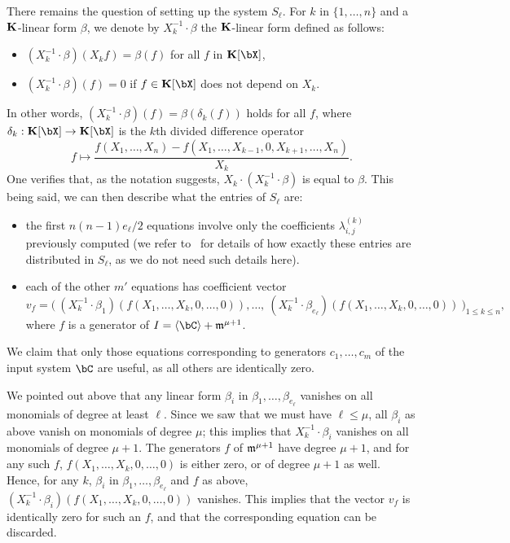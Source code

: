 \documentclass[12pt]{article}
\begin{document}
There remains the question of setting up the system $S_\ell$. For $k$
in $\{1,\dots,n\}$ and a $\mathbf{K}$-linear form $\beta$, we denote by
$X_k^{-1} \cdot \beta$ the $\mathbf{K}$-linear form defined as follows:
\begin{itemize}
\item $(X_k^{-1} \cdot \beta)(X_k f) = \beta(f)$ for all $f$ in $\KK[\bX]$,
\item $(X_k^{-1} \cdot \beta)(f)=0$ if $f\in \KK[\bX]$ does not depend on $X_k$.
\end{itemize}
In other words, $(X_k^{-1} \cdot \beta)(f)=\beta(\delta_k(f))$ holds
for all $f$, where $\delta_k:\KK[\bX] \to \KK[\bX]$ is the $k$th divided
difference operator
$$f\mapsto \frac
{f(X_1,\dots,X_n)-f(X_1,\dots,X_{k-1},0,X_{k+1},\dots,X_n)}{X_k}.$$
One verifies that, as the notation suggests, $X_k \cdot (X_k^{-1}
\cdot \beta)$ is equal to $\beta$. This being said, we can then
describe what the entries of $S_\ell$ are:
\begin{itemize}
\item the first $n(n-1) e_\ell/2$ equations involve only the coefficients 
  $\lambda^{(k)}_{i,j}$ previously computed (we refer to~\cite[Section~4.4]{Mourrain97} for details of how exactly 
these entries are distributed in $S_\ell$, as we do not need such details here).
\item each of the other $m'$ equations has coefficient vector
$$v_f = \big (\
 (X_k^{-1} \cdot \beta_1)(f(X_1,\dots,X_k,0,\dots,0)),\dots,\ (X_k^{-1} \cdot \beta_{e_\ell})(f(X_1,\dots,X_k,0,\dots,0))\
\big )_{1 \le k \le n},$$
where $f$ is a generator of $I=\langle \bC \rangle +\m^{\mu+1}$.
\end{itemize}
We claim that only those equations corresponding to generators
$c_1,\dots,c_m$ of the input system $\bC$ are useful, as all others are identically
zero.

We pointed out above that any linear form $\beta_i$ in
$\beta_1,\dots,\beta_{e_\ell}$ vanishes on all monomials of degree at
least $\ell$. Since we saw that we must have $\ell \le \mu$, all
$\beta_i$ as above vanish on monomials of degree $\mu$; this implies
that $X_k^{-1}\cdot \beta_i$ vanishes on all monomials of degree
$\mu+1$. The generators $f$ of $\mathfrak{m}^{\mu+1}$ have degree $\mu+1$, and
for any such $f$, $f(X_1,\dots,X_k,0,\dots,0)$ is either zero, or of
degree $\mu+1$ as well. Hence, for any $k$, $\beta_i$ in
$\beta_1,\dots,\beta_{e_\ell}$ and $f$ as above, $(X_k^{-1} \cdot
\beta_i)(f(X_1,\dots,X_k,0,\dots,0))$ vanishes. This implies that the
vector $v_f$ is identically zero for such an $f$, and that the
corresponding equation can be discarded.
\end{document}
